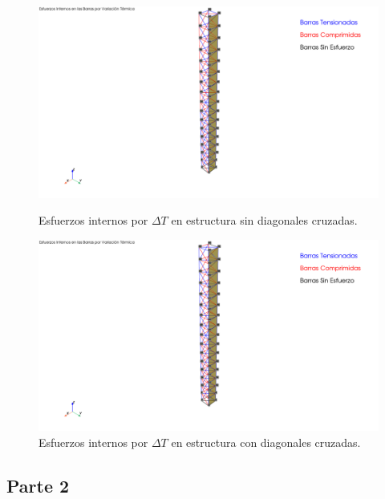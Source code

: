 \begin{figure}[H]
    \centering
    \begin{minipage}{0.45\textwidth}
        \centering
        \includegraphics[width=\textwidth]{GRAFICOS/Esfuerzos Internos en las Barras por Variación Térmica False.png}
        \caption{Esfuerzos internos por $\Delta T$ en estructura sin diagonales cruzadas.}
        \label{fig:imagen77}
    \end{minipage}
    \hfill
    \begin{minipage}{0.45\textwidth}
        \centering
        \includegraphics[width=\textwidth]{GRAFICOS/Esfuerzos Internos en las Barras por Variación Térmica True.png}
        \caption{Esfuerzos internos por $\Delta T$ en estructura con diagonales cruzadas.}
        \label{fig:imagen88}
    \end{minipage}
\end{figure}

\subsection{Parte 2}

